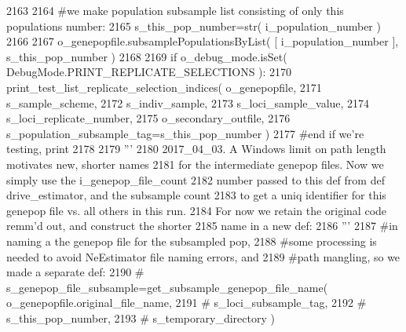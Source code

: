 \begin{DoxyCode}
2163 
2164                 \textcolor{comment}{#we make population subsample list consisting of only this populations number:}
2165                 s\_this\_pop\_number=str( i\_population\_number ) 
2166 
2167                 o\_genepopfile.subsamplePopulationsByList( [ i\_population\_number ], s\_this\_pop\_number )
2168 
2169                 \textcolor{keywordflow}{if} o\_debug\_mode.isSet( DebugMode.PRINT\_REPLICATE\_SELECTIONS ):
2170                     print\_test\_list\_replicate\_selection\_indices( o\_genepopfile, 
2171                                             s\_sample\_scheme,    
2172                                             s\_indiv\_sample, 
2173                                             s\_loci\_sample\_value,
2174                                             s\_loci\_replicate\_number,
2175                                             o\_secondary\_outfile, 
2176                                             s\_population\_subsample\_tag=s\_this\_pop\_number )
2177                 \textcolor{comment}{#end if we're testing, print }
2178 
2179                 \textcolor{stringliteral}{'''}
2180 \textcolor{stringliteral}{                2017\_04\_03.  A Windows limit on path length motivates new, shorter names}
2181 \textcolor{stringliteral}{                for the intermediate genepop files.  Now we simply use the i\_genepop\_file\_count}
2182 \textcolor{stringliteral}{                number passed to this def from def drive\_estimator, and the subsample count}
2183 \textcolor{stringliteral}{                to get a uniq identifier for this genepop file vs. all others in this run.}
2184 \textcolor{stringliteral}{                For now we retain the original code remm'd out, and construct the shorter}
2185 \textcolor{stringliteral}{                name in a new def:}
2186 \textcolor{stringliteral}{                '''}
2187                 \textcolor{comment}{#in naming a the genepop file for the subsampled pop,}
2188                 \textcolor{comment}{#some processing is needed to avoid NeEstimator file naming errors, and}
2189                 \textcolor{comment}{#path mangling, so we made a separate def:}
2190 \textcolor{comment}{#               s\_genepop\_file\_subsample=get\_subsample\_genepop\_file\_name( o\_genepopfile.original\_file\_name,
       }
2191 \textcolor{comment}{#                                                       s\_loci\_subsample\_tag, }
2192 \textcolor{comment}{#                                                       s\_this\_pop\_number,}
2193 \textcolor{comment}{#                                                       s\_temporary\_directory )}

\end{DoxyCode}
